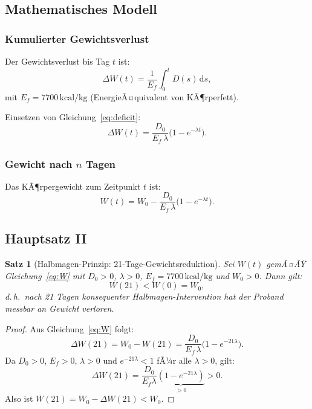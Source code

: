 ﻿\documentclass[12pt,a4paper]{article}
\theoremstyle{plain}
\newtheorem{theorem}{Satz}[section]
\theoremstyle{definition}
\theoremstyle{remark}
\begin{document}
\subsection{Mathematisches Modell}

\subsubsection{Kumulierter Gewichtsverlust}

Der Gewichtsverlust bis Tag $t$ ist:
\begin{equation}
  \Delta W(t) = \frac{1}{E_f} \int_0^t D(s)\,\mathrm{d}s,
  \label{eq:dW_int}
\end{equation}
mit $E_f = 7700\,\text{kcal/kg}$ (EnergieÃ¤quivalent von KÃ¶rperfett).

Einsetzen von Gleichung~\eqref{eq:deficit}:
\begin{equation}
  \Delta W(t) = \frac{D_0}{E_f \, \lambda}
    \bigl(1 - e^{-\lambda t}\bigr).
  \label{eq:dW}
\end{equation}

\subsubsection{Gewicht nach $n$ Tagen}

Das KÃ¶rpergewicht zum Zeitpunkt $t$ ist:
\begin{equation}
  \boxed{W(t) = W_0 - \frac{D_0}{E_f \, \lambda}
    \bigl(1 - e^{-\lambda t}\bigr).}
  \label{eq:W}
\end{equation}

\subsection{Hauptsatz II}

\begin{theorem}[Halbmagen-Prinzip: 21-Tage-Gewichtsreduktion]
\label{thm:diet}
Sei $W(t)$ gemÃ¤ÃŸ Gleichung~\eqref{eq:W} mit $D_0 > 0$, $\lambda > 0$,
$E_f = 7700\,\text{kcal/kg}$ und $W_0 > 0$. Dann gilt:
\begin{equation}
  W(21) < W(0) = W_0,
  \label{eq:loss}
\end{equation}
d.\,h.\ nach 21 Tagen konsequenter Halbmagen-Intervention hat der Proband
messbar an Gewicht verloren.
\end{theorem}

\begin{proof}
Aus Gleichung~\eqref{eq:W} folgt:
\begin{equation}
  \Delta W(21) = W_0 - W(21) = \frac{D_0}{E_f \, \lambda}\bigl(1-e^{-21\lambda}\bigr).
\end{equation}
Da $D_0 > 0$, $E_f > 0$, $\lambda > 0$ und $e^{-21\lambda} < 1$ fÃ¼r alle
$\lambda > 0$, gilt:
\begin{equation}
  \Delta W(21) = \frac{D_0}{E_f \lambda}\underbrace{(1-e^{-21\lambda})}_{>0} > 0.
\end{equation}
Also ist $W(21) = W_0 - \Delta W(21) < W_0$.
\end{proof}
\end{document}
